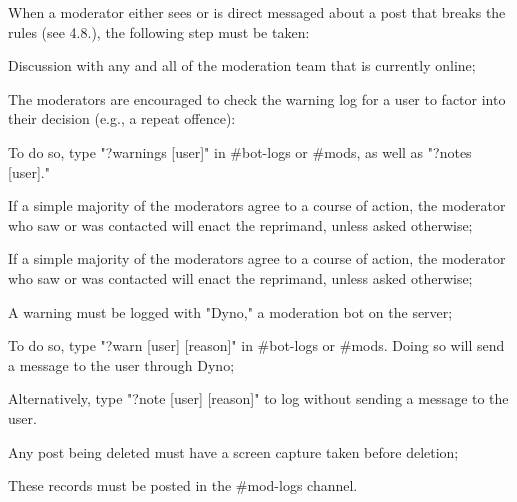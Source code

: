 \begin{longenum}[ label*=\thesubsection.\arabic*., align=left]
\begin{longenum}[label*=\arabic*., align=left]
		\item When a moderator either sees or is direct messaged about a post that breaks the rules (see 4.8.), the following step must be taken:
			\begin{longenum}[label*=\arabic*., align=left]	
			\item Discussion with any and all of the moderation team that is currently online;
				\begin{longenum}[label*=\arabic*., align=left]
				\item The moderators are encouraged to check the warning log for a user to factor into their decision (e.g., a repeat offence):
					\begin{longenum}[label*=\arabic*., align=left]
					\item To do so, type "?warnings [user]" in \#bot-logs or \#mods, as well as "?notes [user]."
					\end{longenum}	
				\end{longenum}	
			\item If a simple majority of the moderators agree to a course of action, the moderator who saw or was contacted will enact the reprimand, unless asked otherwise;
				\begin{longenum}[label*=\arabic*., align=left]
				\item If a simple majority of the moderators agree to a course of action, the moderator who saw or was contacted will enact the reprimand, unless asked otherwise;
				\end{longenum}	
			\item A warning must be logged with "Dyno," a moderation bot on the server;
				\begin{longenum}[label*=\arabic*., align=left]
				\item To do so, type "?warn [user] [reason]" in \#bot-logs or \#mods. Doing so will send a message to the user through Dyno;
				\end{longenum}	
				\begin{longenum}[label*=\arabic*., align=left]
				\item Alternatively, type "?note [user] [reason]" to log without sending a message to the user.
				\end{longenum}	
			\item Any post being deleted must have a screen capture taken before deletion;
				\begin{longenum}[label*=\arabic*., align=left]
				\item These records must be posted in the \#mod-logs channel.

\end{longenum}
\end{longenum}
\end{longenum}
\end{longenum}
